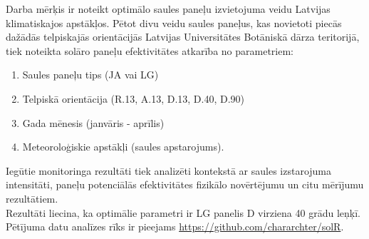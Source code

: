 Darba mērķis ir noteikt optimālo saules paneļu izvietojuma veidu Latvijas klimatiskajos apstākļos. 
Pētot divu veidu saules paneļus, kas novietoti piecās dažādās telpiskajās orientācijās Latvijas Universitātes Botāniskā dārza teritorijā, tiek noteikta solāro paneļu efektivitātes atkarība no parametriem:
\begin{enumerate}
\item Saules paneļu tips (JA vai LG)
\item Telpiskā orientācija (R.13, A.13, D.13, D.40, D.90)
\item Gada mēnesis (janvāris - aprīlis)
\item Meteoroloģiskie apstākļi (saules apstarojums).
\end{enumerate}

Iegūtie monitoringa rezultāti tiek analizēti kontekstā ar saules izstarojuma intensitāti, paneļu potenciālās efektivitātes fizikālo novērtējumu un citu mērījumu rezultātiem.\\
Rezultāti liecina, ka optimālie parametri ir LG panelis D virziena 40 grādu leņķī. Pētījuma datu analīzes rīks ir pieejams \url{https://github.com/chararchter/solR}.

